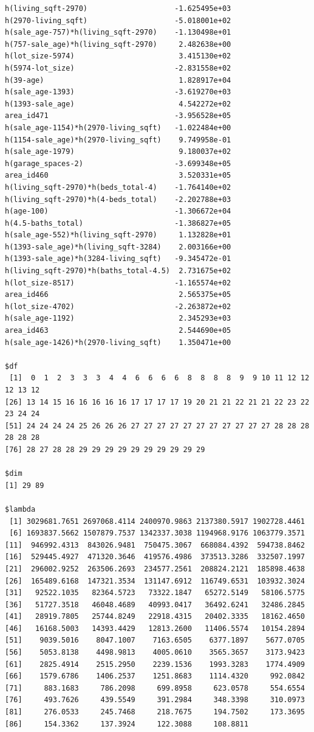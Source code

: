 \documentclass[
]{article}
\begin{document}
\begin{verbatim}
h(living_sqft-2970)                    -1.625495e+03
h(2970-living_sqft)                    -5.018001e+02
h(sale_age-757)*h(living_sqft-2970)    -1.130498e+01
h(757-sale_age)*h(living_sqft-2970)     2.482638e+00
h(lot_size-5974)                        3.415130e+02
h(5974-lot_size)                       -2.831558e+02
h(39-age)                               1.828917e+04
h(sale_age-1393)                       -3.619270e+03
h(1393-sale_age)                        4.542272e+02
area_id471                             -3.956528e+05
h(sale_age-1154)*h(2970-living_sqft)   -1.022484e+00
h(1154-sale_age)*h(2970-living_sqft)    9.749958e-01
h(sale_age-1979)                        9.180037e+02
h(garage_spaces-2)                     -3.699348e+05
area_id460                              3.520331e+05
h(living_sqft-2970)*h(beds_total-4)    -1.764140e+02
h(living_sqft-2970)*h(4-beds_total)    -2.202788e+03
h(age-100)                             -1.306672e+04
h(4.5-baths_total)                     -1.386827e+05
h(sale_age-552)*h(living_sqft-2970)     1.132828e+01
h(1393-sale_age)*h(living_sqft-3284)    2.003166e+00
h(1393-sale_age)*h(3284-living_sqft)   -9.345472e-01
h(living_sqft-2970)*h(baths_total-4.5)  2.731675e+02
h(lot_size-8517)                       -1.165574e+02
area_id466                              2.565375e+05
h(lot_size-4702)                       -2.263872e+02
h(sale_age-1192)                        2.345293e+03
area_id463                              2.544690e+05
h(sale_age-1426)*h(2970-living_sqft)    1.350471e+00

$df
 [1]  0  1  2  3  3  3  4  4  6  6  6  6  8  8  8  8  9  9 10 11 12 12 12 13 12
[26] 13 14 15 16 16 16 16 16 17 17 17 17 19 20 21 21 22 21 21 22 23 22 23 24 24
[51] 24 24 24 24 25 26 26 26 27 27 27 27 27 27 27 27 27 27 27 28 28 28 28 28 28
[76] 28 27 28 28 29 29 29 29 29 29 29 29 29 29

$dim
[1] 29 89

$lambda
 [1] 3029681.7651 2697068.4114 2400970.9863 2137380.5917 1902728.4461
 [6] 1693837.5662 1507879.7537 1342337.3038 1194968.9176 1063779.3571
[11]  946992.4313  843026.9481  750475.3067  668084.4392  594738.8462
[16]  529445.4927  471320.3646  419576.4986  373513.3286  332507.1997
[21]  296002.9252  263506.2693  234577.2561  208824.2121  185898.4638
[26]  165489.6168  147321.3534  131147.6912  116749.6531  103932.3024
[31]   92522.1035   82364.5723   73322.1847   65272.5149   58106.5775
[36]   51727.3518   46048.4689   40993.0417   36492.6241   32486.2845
[41]   28919.7805   25744.8249   22918.4315   20402.3335   18162.4650
[46]   16168.5003   14393.4429   12813.2600   11406.5574   10154.2894
[51]    9039.5016    8047.1007    7163.6505    6377.1897    5677.0705
[56]    5053.8138    4498.9813    4005.0610    3565.3657    3173.9423
[61]    2825.4914    2515.2950    2239.1536    1993.3283    1774.4909
[66]    1579.6786    1406.2537    1251.8683    1114.4320     992.0842
[71]     883.1683     786.2098     699.8958     623.0578     554.6554
[76]     493.7626     439.5549     391.2984     348.3398     310.0973
[81]     276.0533     245.7468     218.7675     194.7502     173.3695
[86]     154.3362     137.3924     122.3088     108.8811


\end{verbatim}
\end{document}
